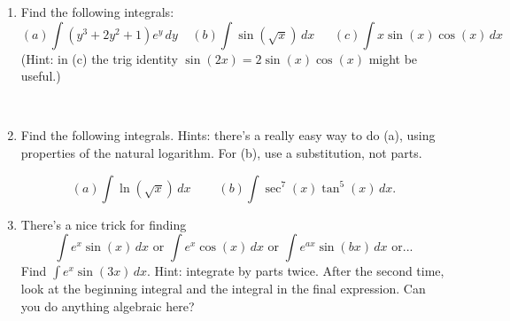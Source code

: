 \documentclass[11pt, oneside]{article}   	%
\title{}
\author{Week 5 discussion problems}
\date{}							%
\begin{document}
\maketitle

\begin{enumerate}

 \item Find the following integrals: 
 $$(a) \int \left( y^3+2y^2+1 \right) e^y\,dy \ \ \ \ \  (b) \int \sin(\sqrt{x}) \,dx \ \ \ \ \ \ \ (c) \int x \sin(x)\cos(x) \,  dx$$
(Hint: in (c) the trig identity $\sin(2x)=2\sin(x)\cos(x)$ might be useful.) 

\

\item Find the following integrals. Hints: there's a really easy way to do (a),  using properties of  the natural logarithm. For (b), use a substitution, not parts.

$$(a) \int \ln(\sqrt{x}) \, dx\ \ \ \ \ \ \ \ \ \ (b)\int  \sec^7(x) \tan^5(x) \, dx.$$


\item There's a nice trick for finding 
$$\int e^x\sin(x) \, dx \textrm{  or } \int e^x \cos(x) \, dx \textrm{    or } \int e^{ax} \sin(bx) \, dx \textrm{     or...}$$
Find $ \int e^x\sin(3x) \, dx$. Hint: integrate by parts twice. After the second time, look at the beginning integral and the integral in the final expression. Can you do anything algebraic here?



\end{enumerate}
\end{document}
